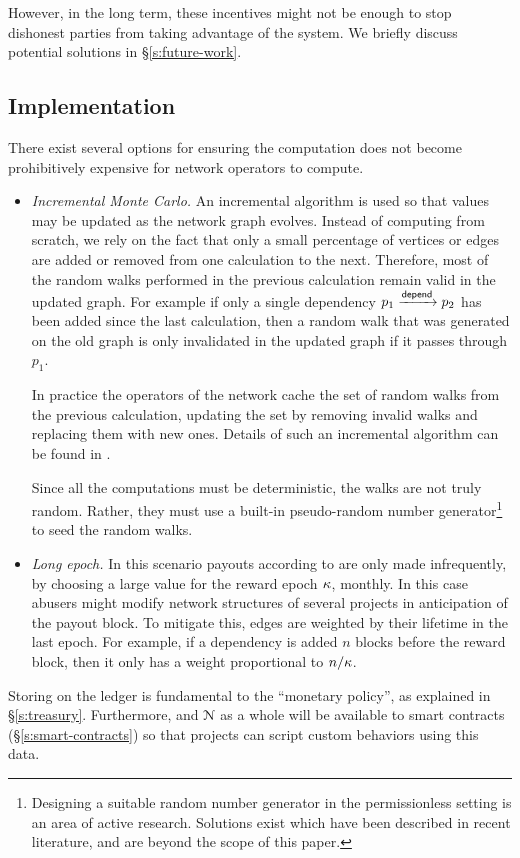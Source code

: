 However, in the long term, these incentives might not be enough to stop dishonest
parties from taking advantage of the system. We briefly discuss potential
solutions in \S\ref{s:future-work}.

\subsection{Implementation}

There exist several options for ensuring the \osrank{} computation
does not become prohibitively expensive for network operators to compute.

\begin{itemize}
\item \emph{Incremental Monte Carlo.} An incremental algorithm is used so that
  \osrank{} values may be updated as the network graph evolves. Instead of
  computing \osrank{} from scratch, we rely on the fact that only a small
  percentage of vertices or edges are added or removed
  from one calculation to the next. Therefore, most of the random walks
  performed in the previous calculation remain valid in the updated graph. For
  example if only a single dependency $p_1 \xrightarrow[]{\mathsf{depend}} p_2$ has been
  added since the last calculation, then a random walk that was generated on the
  old graph is only invalidated in the updated graph if it passes through $p_1$.

  In practice the operators of the network cache the set of random
  walks from the previous calculation, updating the set by removing
  invalid walks and replacing them with new ones. Details of such an
  incremental \pagerank{} algorithm can be found
  in \cite{incr pagerank}.

  Since all the computations must be deterministic, the walks are not truly
  random. Rather, they must use a built-in pseudo-random number
  generator\footnote{Designing a suitable random number generator in the
  permissionless setting is an area of active research. Solutions exist
  which have been described in recent literature, and are beyond the
  scope of this paper.} to seed the random walks.

\item \emph{Long epoch.} In this scenario payouts according to
  \osrank{} are only made infrequently, by choosing a large value for the
  reward epoch $\kappa$, \eg{} monthly.  In this case
  abusers might modify network structures of several projects in
  anticipation of the payout block. To mitigate this, edges are
  weighted by their lifetime in the last epoch. For
  example, if a dependency is added $n$ blocks before the reward block,
  then it only has a weight proportional to $n/\kappa$.
\end{itemize}

\bigskip

\noindent Storing \osrank{} on the ledger is fundamental to the \oscoin{}
``monetary policy'', as explained in \S \ref{s:treasury}. Furthermore,
\osrank{} and $\mathcal{N}$ as a whole will be available to smart contracts
(\S\ref{s:smart-contracts}) so that projects can script custom behaviors using
this data.

